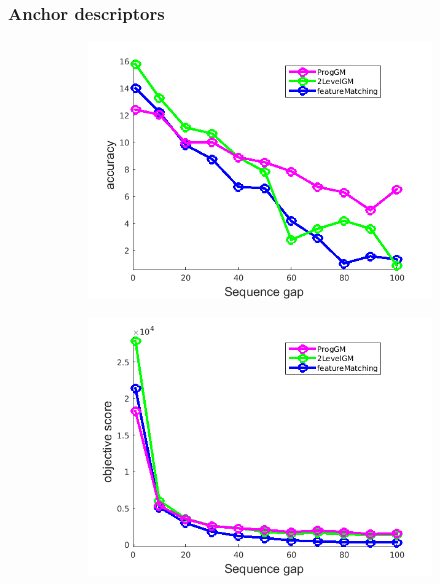 \subsubsection{Anchor descriptors}
\vspace{-20pt}
\begin{figure}[h] 
	\begin{subfigure}[b]{0.3\textwidth}
		\centering
		\includegraphics[scale=0.25]{"chapter3/fig/HouseSeq/anchor_descr/using_cpd_afftrafo/solution/performance/accuracy"}  
	\end{subfigure}%
	\begin{subfigure}[b]{0.3\textwidth}
		\centering
		\includegraphics[scale=0.25]{"chapter3/fig/HouseSeq/anchor_descr/using_cpd_afftrafo/solution/performance/score"}  

\end{subfigure}
\end{figure}
